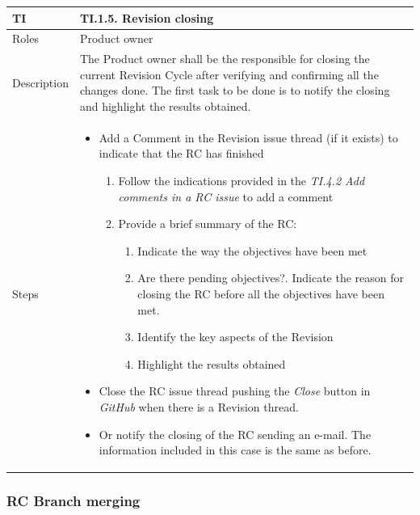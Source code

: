 \documentclass{template/openetcs_article}
\begin{document}
\begin{flushleft}
\tablefirsthead{}
\tablehead{}
\tabletail{}
\tablelasttail{}
\begin{supertabular}{|m{2cm}|m{13cm}|}
\hline
{}
TI & 
TI.1.5. Revision closing
\\\hline
Roles &
Product owner
\\\hline
Description &
The Product owner shall be the responsible for closing the current Revision Cycle after verifying and confirming all the changes done. The first task to be done is to notify the closing and highlight the results obtained.
\\\hline
Steps &
\begin{itemize}
\item Add a Comment in the Revision issue thread (if it exists) to indicate that the RC has finished
\begin{enumerate}
\item Follow the indications provided in the {\it TI.4.2 Add comments in a RC issue} to add a comment
\item Provide a brief summary of the RC:
\begin{enumerate}
\item Indicate the way the objectives have been met 
\item Are there pending objectives?. Indicate the reason for closing the RC before all the objectives have been met.
\item Identify the key aspects of the Revision
\item Highlight the results obtained
\end{enumerate}
\end{enumerate}
\item Close the RC issue thread pushing the {\it Close} button in {\it GitHub} when there is a Revision thread.
\item Or notify the closing of the RC sending an e-mail. The information included in this case is the same as before.
\end{itemize}
\\\hline
\end{supertabular}
\end{flushleft}

\subsubsection{RC Branch merging}
\end{document}
